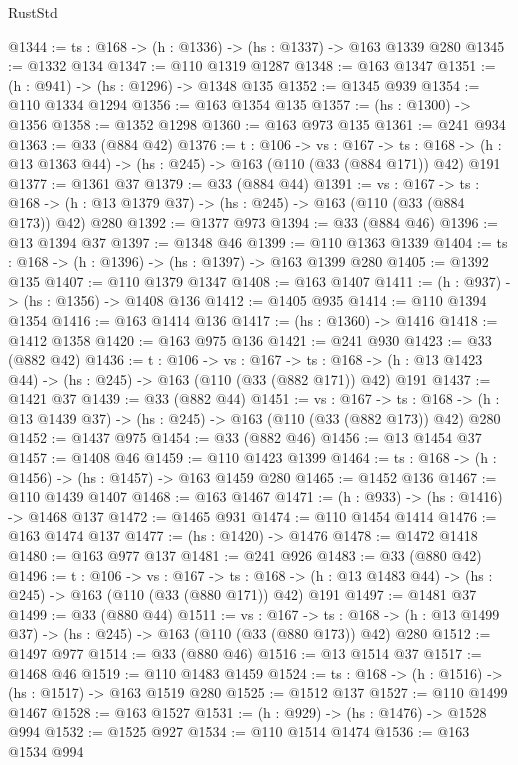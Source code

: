 \begin{lexlean}{RustStd}
\begin{coremodule}
@1344 := {ts : @168} -> (h : @1336) -> (hs : @1337) -> @163 @1339 @280
@1345 := @1332 @134
@1347 := @110 @1319 @1287
@1348 := @163 @1347
@1351 := (h : @941) -> (hs : @1296) -> @1348 @135
@1352 := @1345 @939
@1354 := @110 @1334 @1294
@1356 := @163 @1354 @135
@1357 := (hs : @1300) -> @1356
@1358 := @1352 @1298
@1360 := @163 @973 @135
@1361 := @241 @934
@1363 := @33 (@884 @42)
@1376 := {t : @106} ->
  {vs : @167} ->
  {ts : @168} -> (h : @13 @1363 @44) -> (hs : @245) -> @163 (@110 (@33 (@884 @171)) @42) @191
@1377 := @1361 @37
@1379 := @33 (@884 @44)
@1391 := {vs : @167} ->
  {ts : @168} -> (h : @13 @1379 @37) -> (hs : @245) -> @163 (@110 (@33 (@884 @173)) @42) @280
@1392 := @1377 @973
@1394 := @33 (@884 @46)
@1396 := @13 @1394 @37
@1397 := @1348 @46
@1399 := @110 @1363 @1339
@1404 := {ts : @168} -> (h : @1396) -> (hs : @1397) -> @163 @1399 @280
@1405 := @1392 @135
@1407 := @110 @1379 @1347
@1408 := @163 @1407
@1411 := (h : @937) -> (hs : @1356) -> @1408 @136
@1412 := @1405 @935
@1414 := @110 @1394 @1354
@1416 := @163 @1414 @136
@1417 := (hs : @1360) -> @1416
@1418 := @1412 @1358
@1420 := @163 @975 @136
@1421 := @241 @930
@1423 := @33 (@882 @42)
@1436 := {t : @106} ->
  {vs : @167} ->
  {ts : @168} -> (h : @13 @1423 @44) -> (hs : @245) -> @163 (@110 (@33 (@882 @171)) @42) @191
@1437 := @1421 @37
@1439 := @33 (@882 @44)
@1451 := {vs : @167} ->
  {ts : @168} -> (h : @13 @1439 @37) -> (hs : @245) -> @163 (@110 (@33 (@882 @173)) @42) @280
@1452 := @1437 @975
@1454 := @33 (@882 @46)
@1456 := @13 @1454 @37
@1457 := @1408 @46
@1459 := @110 @1423 @1399
@1464 := {ts : @168} -> (h : @1456) -> (hs : @1457) -> @163 @1459 @280
@1465 := @1452 @136
@1467 := @110 @1439 @1407
@1468 := @163 @1467
@1471 := (h : @933) -> (hs : @1416) -> @1468 @137
@1472 := @1465 @931
@1474 := @110 @1454 @1414
@1476 := @163 @1474 @137
@1477 := (hs : @1420) -> @1476
@1478 := @1472 @1418
@1480 := @163 @977 @137
@1481 := @241 @926
@1483 := @33 (@880 @42)
@1496 := {t : @106} ->
  {vs : @167} ->
  {ts : @168} -> (h : @13 @1483 @44) -> (hs : @245) -> @163 (@110 (@33 (@880 @171)) @42) @191
@1497 := @1481 @37
@1499 := @33 (@880 @44)
@1511 := {vs : @167} ->
  {ts : @168} -> (h : @13 @1499 @37) -> (hs : @245) -> @163 (@110 (@33 (@880 @173)) @42) @280
@1512 := @1497 @977
@1514 := @33 (@880 @46)
@1516 := @13 @1514 @37
@1517 := @1468 @46
@1519 := @110 @1483 @1459
@1524 := {ts : @168} -> (h : @1516) -> (hs : @1517) -> @163 @1519 @280
@1525 := @1512 @137
@1527 := @110 @1499 @1467
@1528 := @163 @1527
@1531 := (h : @929) -> (hs : @1476) -> @1528 @994
@1532 := @1525 @927
@1534 := @110 @1514 @1474
@1536 := @163 @1534 @994

\end{coremodule}
\end{lexlean}
